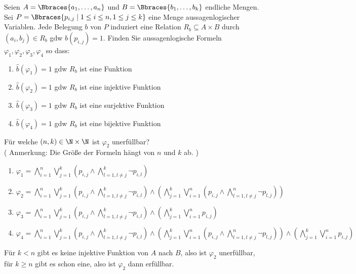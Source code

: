 
\begin{exercise}[48]

Seien $A = \Bbraces{a_1, \dots, a_n}$ und $B = \Bbraces{b_1, \dots, b_k}$ endliche Mengen.
Sei $P = \Bbraces{p_{i, j} \mid 1 \leq i \leq n, 1 \leq j \leq k}$ eine Menge aussagenlogischer Variablen.
Jede Belegung $b$ von $P$ induziert eine Relation $R_b \subseteq A \times B$ durch $(a_i, b_j) \in R_b$ gdw $b(p_{i, j}) = 1$.
Finden Sie aussagenlogische Formeln $\varphi_1, \varphi_2, \varphi_3, \varphi_4$ so dass:

\begin{enumerate}[label = \arabic*.]
    \item $\hat{b}(\varphi_1) = 1$ gdw $R_b$ ist eine Funktion
    \item $\hat{b}(\varphi_2) = 1$ gdw $R_b$ ist eine injektive Funktion
    \item $\hat{b}(\varphi_3) = 1$ gdw $R_b$ ist eine surjektive Funktion
    \item $\hat{b}(\varphi_4) = 1$ gdw $R_b$ ist eine bijektive Funktion
\end{enumerate}

Für welche $(n, k) \in \N \times \N$ ist $\varphi_2$ unerfüllbar? \\

(
    Anmerkung:
    Die Größe der Formeln hängt von $n$ und $k$ ab.
)

\end{exercise}


\begin{solution}
\phantom{}
\begin{enumerate}[label = \arabic*.]
	\item $\varphi_1 = \bigwedge_{i=1}^n \bigvee_{j=1}^k\left(p_{i,j} \land \bigwedge_{l=1,l\neq j}^{k}\neg p_{i,l}\right)$
	\item $\varphi_2 = \bigwedge_{i=1}^n \bigvee_{j=1}^k\left(p_{i,j} \land \bigwedge_{l=1,l\neq j}^{k}\neg p_{i,l}\right)
  \land  \left(\bigwedge_{j=1}^k \bigvee_{i=1}^n\left(p_{i,j} \land \bigwedge_{l=1,l\neq j}^{n}\neg p_{l,j}\right)\right)$
	\item $\varphi_3 = \bigwedge_{i=1}^n \bigvee_{j=1}^k\left(p_{i,j} \land \bigwedge_{l=1,l\neq j}^{k}\neg p_{i,l}\right) \land
  \left(\bigwedge_{j=1}^k \bigvee_{i=1}^np_{i,j}\right)$
	\item $\varphi_4 = \bigwedge_{i=1}^n \bigvee_{j=1}^k\left(p_{i,j} \land \bigwedge_{l=1,l\neq j}^{k}\neg p_{i,l}\right)
  \land  \left(\bigwedge_{j=1}^k \bigvee_{i=1}^n\left(p_{i,j} \land \bigwedge_{l=1,l\neq j}^{n}\neg p_{l,j}\right)\right) \land
  \left(\bigwedge_{j=1}^k \bigvee_{i=1}^np_{i,j}\right)$
\end{enumerate}
Für $k < n$ gibt es keine injektive Funktion von $A$ nach $B$, also ist $\varphi_2$ unerfüllbar, für $k \geq n$ gibt es schon eine, also ist $\varphi_2$ dann erfüllbar.

\end{solution}


